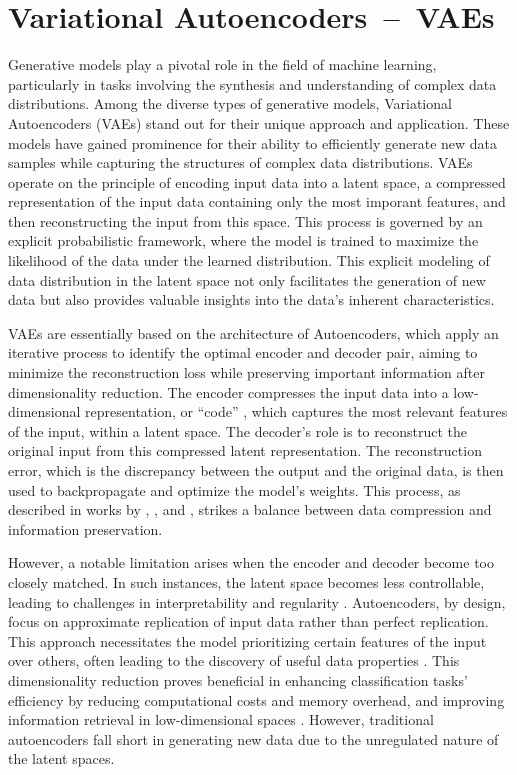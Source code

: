 \section{Variational Autoencoders~--~VAEs}\label{VAEs}

Generative models play a pivotal role in the field of machine learning, particularly in tasks involving the synthesis and understanding of complex data distributions. Among the diverse types of generative models, Variational Autoencoders (VAEs) stand out for their unique approach and application. These models have gained prominence for their ability to efficiently generate new data samples while capturing the structures of complex data distributions. VAEs operate on the principle of encoding input data into a latent space, a compressed representation of the input data containing only the most imporant features, and then reconstructing the input from this space. This process is governed by an explicit probabilistic framework, where the model is trained to maximize the likelihood of the data under the learned distribution. This explicit modeling of data distribution in the latent space not only facilitates the generation of new data but also provides valuable insights into the data’s inherent characteristics. 

VAEs are essentially based on the architecture of Autoencoders, which apply an iterative process to identify the optimal encoder and decoder pair, aiming to minimize the reconstruction loss while preserving important information after dimensionality reduction. The encoder compresses the input data into a low-dimensional representation, or ``code'' \citep{hintonCode, GoodfellowDeepLearning}, which captures the most relevant features of the input, within a latent space. The decoder's role is to reconstruct the original input from this compressed latent representation. The reconstruction error, which is the discrepancy between the output and the original data, is then used to backpropagate and optimize the model's weights. This process, as described in works by \citeauthor{hintonCode}, \citeauthor{GoodfellowDeepLearning}, and \citeauthor{michelucci2022introduction}, strikes a balance between data compression and information preservation.

However, a notable limitation arises when the encoder and decoder become too closely matched. In such instances, the latent space becomes less controllable, leading to challenges in interpretability and regularity \citep{michelucci2022introduction}. Autoencoders, by design, focus on approximate replication of input data rather than perfect replication. This approach necessitates the model prioritizing certain features of the input over others, often leading to the discovery of useful data properties \citep{GoodfellowDeepLearning}. This dimensionality reduction proves beneficial in enhancing classification tasks' efficiency by reducing computational costs and memory overhead, and improving information retrieval in low-dimensional spaces \citep{GoodfellowDeepLearning}. However, traditional autoencoders fall short in generating new data due to the unregulated nature of the latent spaces.

